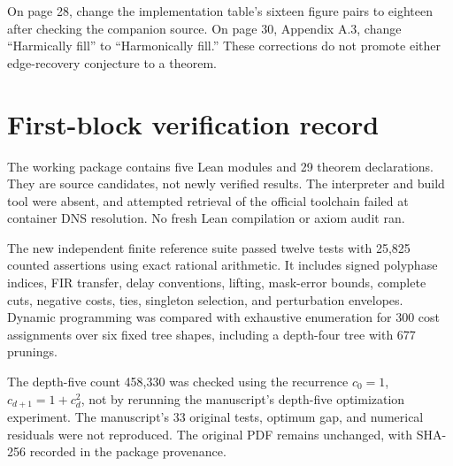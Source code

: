 \documentclass[11pt]{article}
\begin{document}
On page 28, change the implementation table's sixteen figure pairs to eighteen after checking the companion source. On page 30, Appendix A.3, change ``Harmically fill'' to ``Harmonically fill.'' These corrections do not promote either edge-recovery conjecture to a theorem.

\section{First-block verification record}
The working package contains five Lean modules and 29 theorem declarations. They are source candidates, not newly verified results. The interpreter and build tool were absent, and attempted retrieval of the official toolchain failed at container DNS resolution. No fresh Lean compilation or axiom audit ran.

The new independent finite reference suite passed twelve tests with 25,825 counted assertions using exact rational arithmetic. It includes signed polyphase indices, FIR transfer, delay conventions, lifting, mask-error bounds, complete cuts, negative costs, ties, singleton selection, and perturbation envelopes. Dynamic programming was compared with exhaustive enumeration for 300 cost assignments over six fixed tree shapes, including a depth-four tree with 677 prunings.

The depth-five count 458,330 was checked using the recurrence $c_0=1$, $c_{d+1}=1+c_d^2$, not by rerunning the manuscript's depth-five optimization experiment. The manuscript's 33 original tests, optimum gap, and numerical residuals were not reproduced. The original PDF remains unchanged, with SHA-256 recorded in the package provenance.
\end{document}
